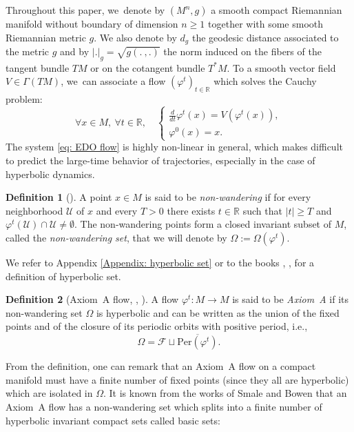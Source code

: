 \documentclass[11pt]{article}
\providecommand{\dpl}{\displaystyle}
\newcommand{\ie}{i.e.,\xspace}
\let\dpl\displaystyle
\theoremstyle{definition}
\newtheorem{definition}{Definition}[section]
\theoremstyle{plain}
\newcommand{\Fcal}{\mathcal{F}}
\newcommand{\R}{\mathbb{R}}
\newcommand{\Ucal}{\mathcal{U}}
\newcommand{\dt}{\frac{d}{dt}}
\begin{document}
Throughout this paper, we~denote by $(M^n,g)$ a smooth compact Riemannian manifold without boundary of dimension $n\geq 1$ together with some smooth Riemannian metric $g$. We also denote by $d_g$ the geodesic distance associated to the metric $g$ and by $|.|_g = \sqrt{g(. \:,.)}$ the norm induced on the fibers of the tangent bundle $TM$ or on the cotangent bundle $T^*M$. To a smooth vector field $V \in \Gamma (TM)$, we~can associate a flow $(\varphi^t)_{t \in \R}$ which solves the Cauchy problem:
\begin{equation}\label{eq: EDO flow}
\forall x \in M, \: \forall t \in \R, \quad
\left\{
\begin{array}{ll}
\dpl\dt \varphi^t (x) = V (\varphi^t (x)), \\[6pt]
\varphi^0 (x) = x.
\end{array}
\right.
\end{equation}
The system \eqref{eq: EDO flow} is highly non-linear in general, which makes difficult to predict the large-time behavior of trajectories, especially in the case of hyperbolic dynamics.

\begin{definition}[{\cite[p.\,796]{smale}}]
A point $x \in M$ is said to be \emph{non-wandering} if for every neighborhood $\Ucal$ of $x$ and every $T > 0$ there exists $t \in \R$ such that $|t| \geq T$ and $\varphi^t (\Ucal) \cap \Ucal \neq \emptyset$. The non-wandering points form a closed invariant subset of $M$, called the \emph{non-wandering set}, that we will denote by $\Omega:= \Omega (\varphi^t)$.
\end{definition}

We refer to Appendix \ref{Appendix: hyperbolic set} or to the books \cite{palis-demelo}, \cite{katok-hasselblatt}, \cite{FH} for a definition of hyperbolic set.

\begin{definition}[{Axiom~A flow, \cite[p.\,803]{smale}, \cite[Def.\,5.3.29]{FH}}]
A flow $\varphi^t: M \to M$ is said to be \emph{Axiom~A} if its non-wandering set $\Omega$ is hyperbolic and can be written as the union of the fixed points and of the closure of its periodic orbits with positive period, \ie\vspace*{-3pt}
\[
\Omega = \Fcal \sqcup \overline{\mathrm{Per} (\varphi^t)}.
\]
\end{definition}

From the definition, one can remark that an Axiom~A flow on a compact manifold must have a finite number of fixed points (since they all are hyperbolic) which are isolated in $\Omega$. It is known from the works of Smale and Bowen that an Axiom~A flow has a non-wandering set which splits into a finite number of hyperbolic invariant compact sets called basic sets:
\end{document}
